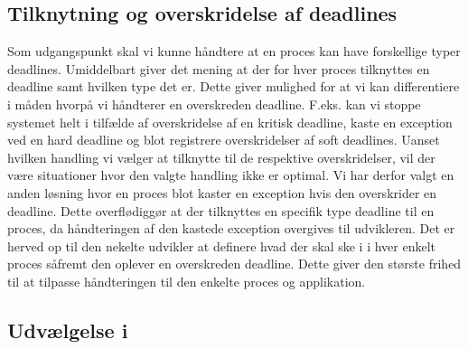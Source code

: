 \subsection{Tilknytning og overskridelse af deadlines}
Som udgangspunkt skal vi kunne håndtere at en proces kan have forskellige typer deadlines. Umiddelbart giver det mening at der for hver proces tilknyttes en deadline samt hvilken type det er. Dette giver mulighed for at vi kan differentiere i måden hvorpå vi håndterer en overskreden deadline. F.eks. kan vi stoppe systemet helt i tilfælde af overskridelse af en kritisk deadline, kaste en exception ved en hard deadline og blot registrere overskridelser af soft deadlines. Uanset hvilken handling vi vælger at tilknytte til de respektive overskridelser, vil der være situationer hvor den valgte handling ikke er optimal. Vi har derfor valgt en anden løsning hvor en proces blot kaster en exception hvis den overskrider en deadline. Dette overflødiggør at der tilknyttes en specifik type deadline til en proces, da håndteringen af den kastede exception overgives til udvikleren. Det er herved op til den nekelte udvikler at definere hvad der skal ske i i hver enkelt proces såfremt den oplever en overskreden deadline. Dette giver den største frihed til at tilpasse håndteringen til den enkelte proces og applikation. 

\subsection{Udvælgelse i }


